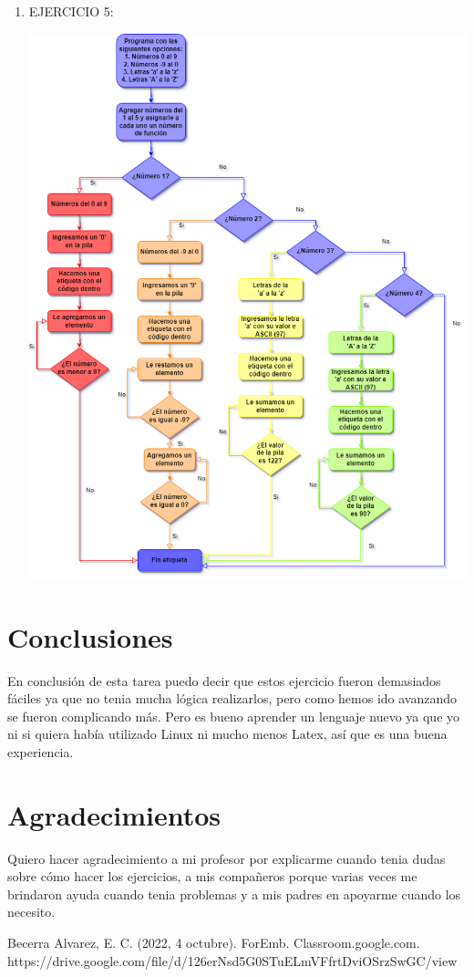 \documentclass[conference]{IEEEtran}
\begin{document}
\begin{enumerate}
	\item  EJERCICIO 5:\\
	\begin{center}
	\includegraphics{diagrama5} \\
	\end{center}

\end{enumerate}
\newpage
\section{Conclusiones}  
En conclusión de esta tarea puedo decir que estos ejercicio fueron demasiados fáciles ya que no tenia mucha lógica realizarlos, pero como hemos ido avanzando se fueron complicando más. Pero es bueno aprender un lenguaje nuevo ya que yo ni si quiera había utilizado Linux ni mucho menos Latex, así que es una buena experiencia.

\section*{Agradecimientos}
Quiero hacer agradecimiento a mi profesor por explicarme cuando tenia dudas sobre cómo hacer los ejercicios, a mis compañeros porque varias veces me brindaron ayuda cuando tenia problemas y a mis padres en apoyarme cuando los necesito.

\begin{thebibliography}{00}
 Becerra Alvarez, E. C. (2022, 4 octubre). ForEmb. Classroom.google.com. https://drive.google.com/file/d/126erNsd5G0STuELmVFfrtDviOSrzSwGC/view
\end{thebibliography}
\end{document}
